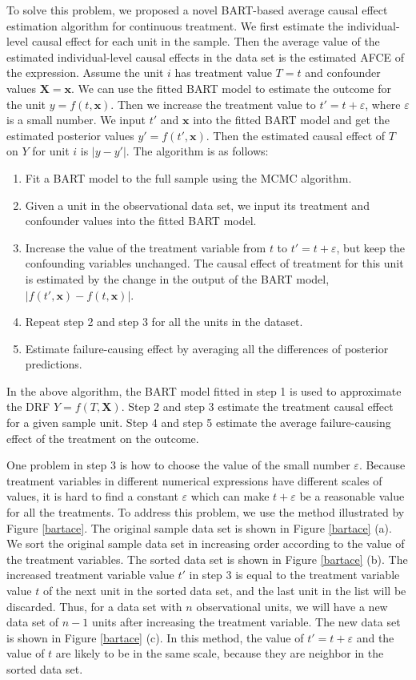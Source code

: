 To solve this problem, we proposed a novel BART-based average causal effect estimation algorithm for continuous treatment. We first estimate the individual-level causal effect for  each unit in the sample. Then the average value of the estimated individual-level causal effects in the data set is the estimated AFCE of the expression.  Assume the unit $i$ has treatment value $T=t$ and confounder values $\pmb {X}=\pmb {x}$. We can use the fitted BART model to estimate the outcome for the unit $y=f(t,\pmb{x})$. Then we increase the treatment value to $t'=t+\varepsilon$, where $\varepsilon $ is a small number. We input $t'$ and $\pmb{x}$ into the fitted BART model and get the estimated posterior values $y'=f(t',\pmb{x})$. Then the estimated causal effect of $T$ on $Y$ for unit $i$ is $\left| {y - y'} \right|$. The algorithm is as follows:
\begin{enumerate}
\item Fit a BART model to the full sample using the MCMC algorithm.
\item Given a unit in the observational data set, we input its treatment and confounder values into the fitted BART model. 
\item Increase the value of the treatment variable from $t$ to $t'=t+\varepsilon$, but keep the confounding variables unchanged. The causal effect of treatment for this unit is estimated by the change in the output of the BART model, $|f(t',\pmb{x})-f(t,\pmb{x})|$.
\item Repeat step 2 and step 3 for all the units in the dataset.
\item Estimate failure-causing effect by averaging all the differences of posterior predictions.
\end{enumerate}

In the above algorithm, the BART model fitted in step 1 is used to approximate the DRF $Y=f(T,\pmb{X})$. Step 2 and step 3 estimate the treatment causal effect for a given sample unit. Step 4 and step 5 estimate the average failure-causing effect of the treatment on the outcome.

One problem in step 3 is how to choose the value of the small number $\varepsilon $. Because treatment variables in different numerical expressions have different scales of values, it is hard to find a constant $\varepsilon$ which can make $t+\varepsilon$ be a reasonable value for all the treatments. To address this problem, we use the method illustrated by Figure \ref{bartace}.  The original sample data set is shown in Figure \ref{bartace} (a).  We sort the original sample data set in increasing order according to the value of the treatment variables. The sorted data set is shown in Figure \ref{bartace} (b). The increased treatment variable value $t'$ in step 3 is equal to the treatment variable value $t$ of the next unit in the sorted data set, and the last unit in the list will be discarded. Thus,  for a data set with $n$ observational units, we will have a new data set of $n-1$ units after increasing the treatment variable. The new data set is shown in Figure \ref{bartace} (c). In this method, the value of $t'=t+\varepsilon$ and the value of $t$ are likely to be in the same scale, because they are neighbor in the sorted data set. 

